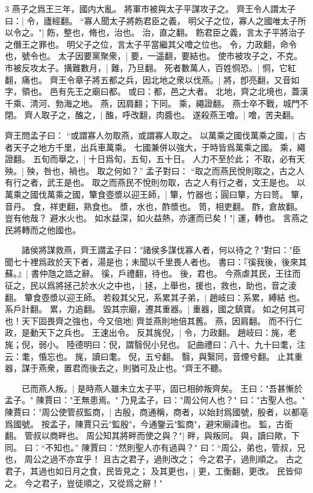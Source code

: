 3 燕子之爲王三年，國内大亂。
  將軍市被與太子平謀攻子之。
  齊王令人謂太子曰：|{
	令，廬經翻。
}
“寡人聞太子將飭君臣之義，
明父子之位，寡人之國唯太子所以令之。"|{
	飭，整也，脩也，治也。
	治，直之翻。
	飭君臣之義，言太子平將治子之僭王之罪也。
	明父子之位，言太子平當繼其父噲之位也。
	令，力政翻，命令也，號令也。
}
太子因要黨聚衆，|{
	要，一遥翻，要結也。
}
使市被攻子之，不克。市被反攻太子。搆難數月，|{
	難，乃旦翻。
}
死者數萬人，百姓恫恐。|{
	恫，它紅翻，痛也。
}
齊王令章子將五都之兵，因北地之衆以伐燕。|{
	將，卽亮翻，又音如字，領也。
	邑有先王之廟曰都。
	或曰：都，邑之大者。
	北地，齊之北境也，蓋漢千乘、清河、勃海之地。
	燕，因肩翻；下同。
	乘，繩證翻。
}
燕士卒不戰，城門不閉。
	齊人取子之，醢之，|{
	醢，呼改翻，肉醬也。
}
遂殺燕王噲。|{
	噲，苦夬翻。
}

齊王問孟子曰：
“或謂寡人勿取燕，或謂寡人取之。
	以萬乘之國伐萬乘之國，|{
	古者天子之地方千里，出兵車萬乘。
	七國兼併以強大，于時皆爲萬乘之國。
	乘，繩證翻。
}
五旬而舉之，|{
	十日爲旬，五旬，五十日。
}
人力不至於此；
不取，必有天殃。|{
	殃，咎也，禍也。
}
取之何如？”
孟子對曰：
“取之而燕民悅則取之，古之人有行之者，武王是也。
	取之而燕民不悅則勿取，古之人有行之者，文王是也。
	以萬乘之國伐萬乘之國，簞食壺漿以迎王師，|{
	簞，竹器也；圓曰簞，方曰笥。
	簞，音丹。
	食，祥吏翻，熟食也。
	漿，水也，酢漿也。
	笥，相吏翻。
	酢，倉故翻。
}
豈有他哉？
避水火也。
如水益深，如火益熱，亦運而已矣！"|{
	運，轉也。
	言燕之民將轉而之他國也。
}

　　諸侯將謀救燕，齊王謂孟子曰："諸侯多謀伐寡人者，何以待之？"對曰："臣聞七十裡爲政於天下者，湯是也；未聞以千里畏人者也。
	書曰：『徯我後，後來其蘇。』|{
	書仲虺之誥之辭。
	徯，戶禮翻，待也。
	後，君也。
}
今燕虐其民，王往而征之，民以爲將拯己於水火之中也，|{
	拯，上舉也，援也，救也，助也，音之淩翻。
}
簞食壺漿以迎王師。
	若殺其父兄，系累其子弟，|{
	趙岐曰：系累，縛結 也。
	系戶計翻。
	累，力追翻。
}
毀其宗廟，遷其重器。|{
	重器，國之鎮寶。
}
如之何其可也！天下固畏齊之強也，今又倍地|{
	齊並燕則地倍其舊。
	燕，因肩翻。
}
而不行仁政，是動天下之兵也。
	王速出令。
	反其旄倪，|{
	令，力政翻。
	趙岐曰：旄，老旄；倪，弱小。
	陸德明曰：倪，謂翳倪小兒也。
	記曲禮曰：八十、九十曰耄，注云：耄，惛忘也。
	旄，讀曰耄。
	倪，五兮翻。
	翳，與繄同，音煙兮翻。
}
止其重器，謀于燕衆，置君而後去之，則猶可及止也。"齊王不聽。


　　已而燕人叛。|{
	是時燕人雖未立太子平，固已相帥叛齊矣。
}
王曰："吾甚慚於孟子。"
陳賈曰："王無患焉。"
乃見孟子，曰："周公何人也？"
曰："古聖人也。"
陳賈曰："周公使管叔監商，|{
	古殷，商通稱，商者，以始封爲國號，殷者，以都亳爲國號。
	按孟子，陳賈只云"監殷"，今通鑒云"監商"，避宋廟諱也。
	監，古銜翻。
}
管叔以商畔也。
	周公知其將畔而使之與？"|{
	畔，與叛同。
	與，讀曰歟，下同。
}
曰：“不知也。”
陳賈曰："然則聖人亦有過與？"
曰：“周公，弟也，管叔，兄也，
	周公之過不亦宜乎！
	且古之君子，過則改之；
	今之君子，過則順之。
	古之君子，其過也如日月之食，民皆見之；
	及其更也，|{
	更，工衡翻，更改。
}
	民皆仰之。
	今之君子，豈徒順之，又從爲之辭！"

